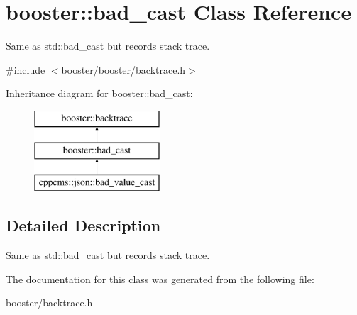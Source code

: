 \section{booster\-:\-:bad\-\_\-cast \-Class \-Reference}
\label{classbooster_1_1bad__cast}


\-Same as std\-::bad\-\_\-cast but records stack trace.  




{\ttfamily \#include $<$booster/booster/backtrace.\-h$>$}

\-Inheritance diagram for booster\-:\-:bad\-\_\-cast\-:\begin{figure}[H]
\begin{center}
\leavevmode
\includegraphics[height=3.000000cm]{classbooster_1_1bad__cast}
\end{center}
\end{figure}


\subsection{\-Detailed \-Description}
\-Same as std\-::bad\-\_\-cast but records stack trace. 

\-The documentation for this class was generated from the following file\-:\begin{DoxyCompactItemize}
\item 
booster/backtrace.\-h\end{DoxyCompactItemize}
